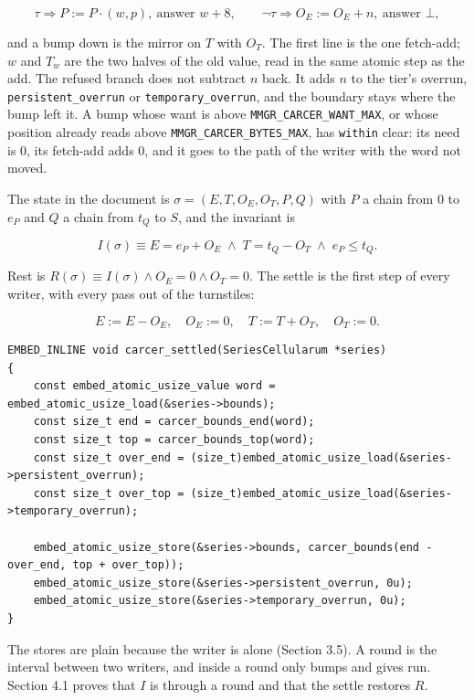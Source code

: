 \[
\tau \Rightarrow P := P \cdot (w, p),\ \text{answer } w + 8, \qquad
\neg\tau \Rightarrow O_E := O_E + n,\ \text{answer } \bot ,
\]

and a bump down is the mirror on \(T\) with \(O_T\). The first line is the one fetch-add; \(w\) and \(T_w\) are the two halves of the old value, read in the same atomic step as the add. The refused branch does not subtract \(n\) back. It adds \(n\) to the tier's overrun, \texttt{persistent\_\allowbreak{}overrun} or \texttt{temporary\_\allowbreak{}overrun}, and the boundary stays where the bump left it. A bump whose want is above \texttt{MMGR\_\allowbreak{}CARCER\_\allowbreak{}WANT\_\allowbreak{}MAX}, or whose position already reads above \texttt{MMGR\_\allowbreak{}CARCER\_\allowbreak{}BYTES\_\allowbreak{}MAX}, has \texttt{within} clear: its need is 0, its fetch-add adds 0, and it goes to the path of the writer with the word not moved.

The state in the document is \(\sigma = (E, T, O_E, O_T, P, Q)\) with \(P\) a chain from 0 to \(e_P\) and \(Q\) a chain from \(t_Q\) to \(S\), and the invariant is

\[
I(\sigma) \equiv E = e_P + O_E \;\wedge\; T = t_Q - O_T \;\wedge\; e_P \le t_Q .
\]

Rest is \(R(\sigma) \equiv I(\sigma) \wedge O_E = 0 \wedge O_T = 0\). The settle is the first step of every writer, with every pass out of the turnstiles:

\[
E := E - O_E,\quad O_E := 0,\quad T := T + O_T,\quad O_T := 0 .
\]

\begin{Verbatim}
EMBED_INLINE void carcer_settled(SeriesCellularum *series)
{
    const embed_atomic_usize_value word = embed_atomic_usize_load(&series->bounds);
    const size_t end = carcer_bounds_end(word);
    const size_t top = carcer_bounds_top(word);
    const size_t over_end = (size_t)embed_atomic_usize_load(&series->persistent_overrun);
    const size_t over_top = (size_t)embed_atomic_usize_load(&series->temporary_overrun);

    embed_atomic_usize_store(&series->bounds, carcer_bounds(end - over_end, top + over_top));
    embed_atomic_usize_store(&series->persistent_overrun, 0u);
    embed_atomic_usize_store(&series->temporary_overrun, 0u);
}
\end{Verbatim}

The stores are plain because the writer is alone (Section 3.5). A round is the interval between two writers, and inside a round only bumps and gives run. Section 4.1 proves that \(I\) is through a round and that the settle restores \(R\).

